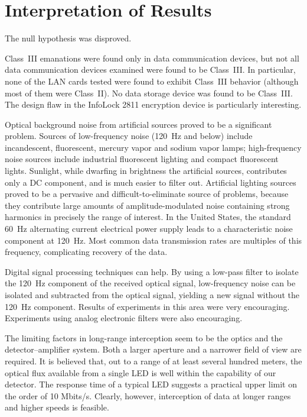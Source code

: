 \documentclass{acmtrans2e}
\begin{document}
\section{Interpretation of Results}

The null hypothesis was disproved.

Class~III emanations were found only in data communication devices, but 
not all data communication devices examined were found to be Class~III.  In particular,
none of the LAN cards tested were found to exhibit Class~III behavior 
(although most of them were Class~II).  No data storage device was found 
to be Class~III.  The design flaw in the InfoLock 2811 encryption device 
is particularly interesting.

Optical background noise from artificial sources proved to be a 
significant problem.  Sources of low-frequency noise (120~Hz and below) 
include incandescent, fluorescent, mercury vapor and sodium vapor lamps; 
high-frequency noise sources include industrial fluorescent lighting and 
compact fluorescent lights.  Sunlight, while dwarfing in brightness the 
artificial sources, contributes only a DC component, and is 
much easier to filter out.  Artificial lighting sources proved to be a 
pervasive and difficult-to-eliminate source of problems,
because they contribute large amounts of amplitude-modulated noise 
containing strong harmonics in precisely the range of interest.  In the 
United States, the standard 60~Hz alternating current electrical 
power supply leads to a characteristic noise component at 120~Hz.  Most 
common data transmission rates are multiples of this frequency, 
complicating recovery of the data.

Digital signal processing techniques can help.  By using a low-pass 
filter to isolate the 120~Hz component of the received optical signal, 
low-frequency noise can be isolated and subtracted from the optical 
signal, yielding a new signal without the 120~Hz component.  Results of 
experiments in this area were very encouraging.   Experiments using 
analog electronic filters were also encouraging.

The limiting factors in long-range interception seem to be the optics 
and the detector--amplifier system.  Both a larger aperture and a narrower 
field of view are required.  It is believed that, out to a range of 
at least several hundred meters, the optical flux available from a
single LED is well within the capability of our detector.  The response
time of a typical LED suggests a practical upper limit on the order of
10 Mbits/s.  Clearly, however, interception of data at longer ranges and
higher speeds is feasible.
\end{document}
